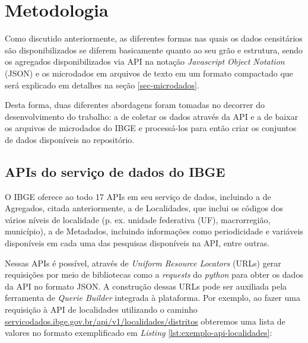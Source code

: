 \chapter{Metodologia}

    

    Como discutido anteriormente, as diferentes formas nas quais os dados censitários são disponibilizados se diferem basicamente quanto ao seu grão e estrutura, sendo os agregados disponibilizados via API na notação \textit{Javascript Object Notation} (JSON) e os microdados em arquivos de texto em um formato compactado que será explicado em detalhes na seção \ref{sec-microdados}. 
    
    Desta forma, duas diferentes abordagens foram tomadas no decorrer do desenvolvimento do trabalho: a de coletar os dados através da API e a de baixar os arquivos de microdados do IBGE e processá-los para então criar os conjuntos de dados disponíveis no repositório.
    

\section{APIs do serviço de dados do IBGE}
\label{metodoslogia-API}

    O IBGE oferece ao todo 17 APIs em seu serviço de dados, incluindo a de Agregados, citada anteriormente, a de Localidades, que inclui os códigos dos vários níveis de localidade (p. ex. unidade federativa (UF), macrorregião, município), a de Metadados, incluindo informações como periodicidade e variáveis disponíveis em cada uma das pesquisas disponíveis na API, entre outras. 
    
    Nessas APIs é possível, através de \textit{Uniform Resource Locators} (URLs) gerar requisições por meio de bibliotecas como a \textit{requests} do \textit{python} para obter os dados da API no formato JSON. A construção dessas URLs pode ser auxiliada pela ferramenta de \textit{Querie Builder} integrada à plataforma. Por exemplo, ao fazer uma requisição à API de localidades utilizando o caminho \url{servicodados.ibge.gov.br/api/v1/localidades/distritos} obteremos uma lista de valores no formato exemplificado em \textit{Listing} \ref{lst:exemplo-api-localidades}:

